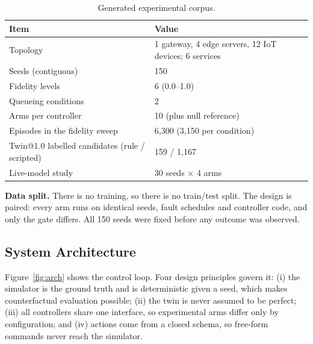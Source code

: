 \documentclass[conference]{IEEEtran}
\begin{document}
\begin{table}[t]
\centering
\caption{Generated experimental corpus.}
\label{tab:dataset}
\footnotesize
\begin{tabular}{@{}p{}p{}@{}}
\toprule
Item & Value \\
\midrule
Topology & 1 gateway, 4 edge servers, 12 IoT devices; 6 services \\
Seeds (contiguous) & 150 \\
Fidelity levels & 6 (0.0--1.0) \\
Queueing conditions & 2 \\
Arms per controller & 10 (plus null reference) \\
Episodes in the fidelity sweep & 6{,}300 (3{,}150 per condition) \\
Twin@1.0 labelled candidates (rule / scripted) & 159 / 1{,}167 \\
Live-model study & 30 seeds $\times$ 4 arms \\
\bottomrule
\end{tabular}
\end{table}

\textbf{Data split.} There is no training, so there is no train/test split. The design is paired: every arm runs on identical seeds, fault schedules and controller code, and only the gate differs. All 150 seeds were fixed before any outcome was observed.

\subsection{System Architecture}

Figure~\ref{fig:arch} shows the control loop. Four design principles govern it: (i) the simulator is the ground truth and is deterministic given a seed, which makes counterfactual evaluation possible; (ii) the twin is never assumed to be perfect; (iii) all controllers share one interface, so experimental arms differ only by configuration; and (iv) actions come from a closed schema, so free-form commands never reach the simulator.
\end{document}
